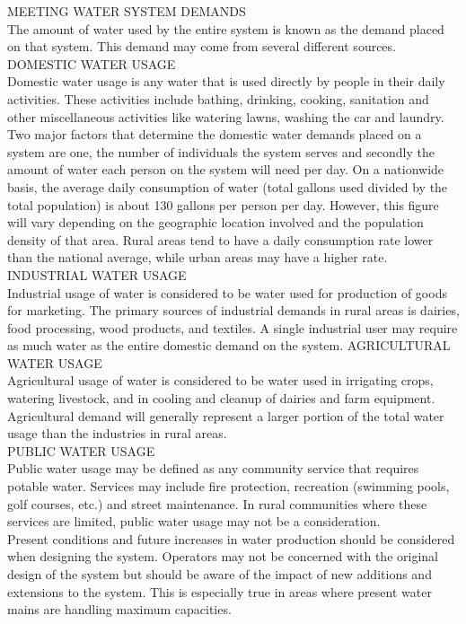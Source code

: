 \documentclass{article}
\begin{document}
MEETING WATER SYSTEM DEMANDS\\
The amount of water used by the entire system is known as the demand placed on that system. This demand may come from several different sources.
DOMESTIC WATER USAGE\\
Domestic water usage is any water that is used directly by people in their daily activities. These activities include bathing, drinking, cooking, sanitation and other miscellaneous activities like watering lawns, washing the car and laundry. Two major factors that determine the domestic water demands placed on a system are one, the number of individuals the system serves and secondly the amount of water each person on the system will need per day. On a nationwide basis, the average daily consumption of water (total gallons used divided by the total population) is about 130 gallons per person per day. However, this figure will vary depending on the geographic location involved and the population density of that area. Rural areas tend to have a daily consumption rate lower than the national average, while urban areas may have a higher rate.\\
INDUSTRIAL WATER USAGE\\
Industrial usage of water is considered to be water used for production of goods for marketing. The primary sources of industrial demands in rural areas is dairies, food processing, wood products, and textiles. A single industrial user may require as much water as the entire domestic demand on the system.
AGRICULTURAL WATER USAGE\\
Agricultural usage of water is considered to be water used in irrigating crops, watering livestock, and in cooling and cleanup of dairies and farm equipment. Agricultural demand will generally represent a larger portion of the total water usage than the industries in rural areas.\\ 
PUBLIC WATER USAGE\\
Public water usage may be defined as any community service that requires potable water. Services may include fire protection, recreation (swimming pools, golf courses, etc.) and street maintenance. In rural communities where these services are limited, public water usage may not be a consideration.\\
Present conditions and future increases in water production should be considered when designing the system. Operators may not be concerned with the original design of the system but should be aware of the impact of new additions and extensions to the system. This is especially true in areas where present water mains are handling maximum capacities.\\
\end{document}

